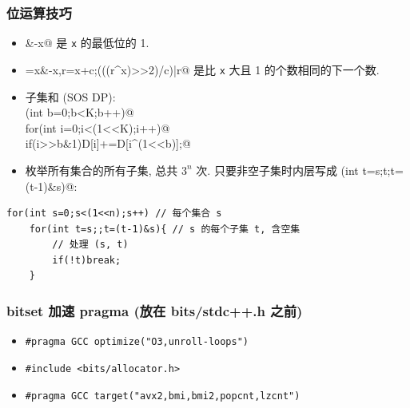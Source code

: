 	\subsubsection{位运算技巧}
			\begin{itemize}
			\item \verb@x&-x@ 是 \texttt{x} 的最低位的 1.
			\item \verb@c=x&-x,r=x+c;(((r^x)>>2)/c)|r@ 是比 \texttt{x} 大且 1 的个数相同的下一个数.
			\item 子集和 (SOS DP): \\ \verb@for(int b=0;b<K;b++)@ \\ \verb@ for(int i=0;i<(1<<K);i++)@ \\ \verb@  if(i>>b&1)D[i]+=D[i^(1<<b)];@
			\item 枚举所有集合的所有子集, 总共 $3^n$ 次. 只要非空子集时内层写成 \verb@for(int t=s;t;t=(t-1)&s)@:
		\end{itemize}
\begin{lstlisting}
for(int s=0;s<(1<<n);s++) // 每个集合 s
	for(int t=s;;t=(t-1)&s){ // s 的每个子集 t, 含空集
		// 处理 (s, t)
		if(!t)break;
	}
\end{lstlisting}
	\subsubsection{bitset 加速 pragma (放在 bits/stdc++.h 之前)}
		\begin{itemize}
			\item \lstinline{#pragma GCC optimize("O3,unroll-loops")}
			\item \lstinline{#include <bits/allocator.h>}
			\item \lstinline{#pragma GCC target("avx2,bmi,bmi2,popcnt,lzcnt")}
		\end{itemize}

